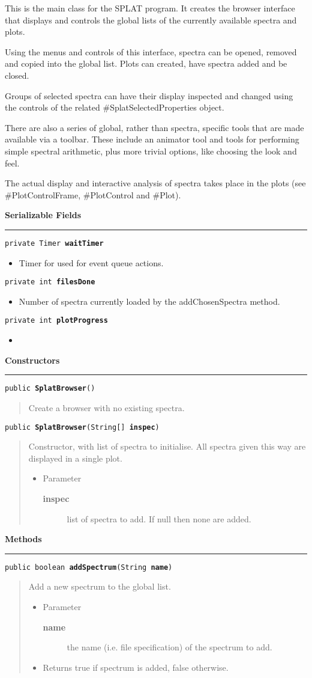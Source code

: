 \documentclass[twoside,11pt,nolof]{starlink}
\providecommand{\method}[1]{\texttt{#1}}
\newenvironment{desc}{\begin{quote}}{\end{quote}}
\providecommand{\constructors}{
   \par\textbf{\large{Constructors}}\\
   \hrule
}
\providecommand{\methods}{
   \par\textbf{\large{Methods}}\\
   \hrule
}
\providecommand{\fields}[1]{
   \par\textbf{\large{#1}}\\
   \hrule
}
\providecommand{\field}[2]{
   \par\texttt{#1}
   \begin{itemize}
   \item #2
   \end{itemize}
}
\begin{document}
{This is the main class for the SPLAT program. It creates the
 browser interface that displays and controls the global lists of
 the currently available spectra and plots.

 Using the menus and controls of this interface, spectra can be
 opened, removed and copied into the global list. Plots can created,
 have spectra added and be closed.

 Groups of selected spectra can have their display inspected and
 changed using the controls of the related \#SplatSelectedProperties
 object.

 There are also a series of global, rather than spectra, specific
 tools that are made available via a toolbar. These include an
 animator tool and tools for performing simple spectral arithmetic,
 plus more trivial options, like choosing the look and feel.

 The actual display and interactive analysis of spectra takes place
 in the plots (see \#PlotControlFrame, \#PlotControl and \#Plot).}
\fields{Serializable Fields}
\field{private Timer \textbf{waitTimer}}{Timer for used for event queue actions.}
\field{private int \textbf{filesDone}}{Number of spectra currently loaded by the addChosenSpectra method.}
\field{private int \textbf{plotProgress}}{}

\constructors
\method{public \textbf{SplatBrowser}()\label{l336}\label{l337}}
\begin{desc}Create a browser with no existing spectra.
\end{desc}

\method{public \textbf{SplatBrowser}(\texttt{String[]} \textbf{inspec})\label{l338}\label{l339}}
\begin{desc}Constructor, with list of spectra to initialise. All spectra
 given this way are displayed in a single plot.
\begin{itemize}
\item{Parameter
  \begin{description}
   \item[\textbf{inspec}]{list of spectra to add. If null then none are
                added.}
  \end{description}}
\end{itemize}
\end{desc}

\methods
\method{public boolean \textbf{addSpectrum}(\texttt{String} \textbf{name})\label{l340}\label{l341}}
\begin{desc}Add a new spectrum to the global list.
\begin{itemize}
\item{Parameter
  \begin{description}
   \item[\textbf{name}]{the name (i.e. file specification) of the spectrum
              to add.}
  \end{description}}
\end{itemize}
\begin{itemize}
\item{Returns true if spectrum is added, false otherwise. }
\end{itemize}
\end{desc}
\end{document}
